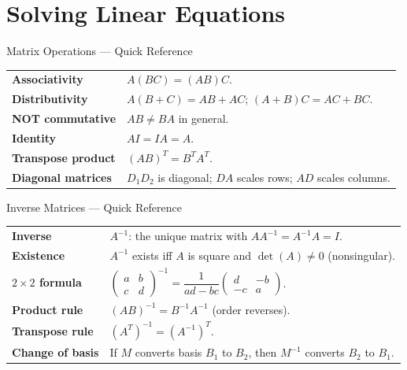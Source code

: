 

\section{Solving Linear Equations}

\begin{toolkitbox}{Matrix Operations --- Quick Reference}
\begin{tabular}{@{}p{}p{}@{}}
\textbf{Associativity}    & $A(BC) = (AB)C$. \\[4pt]
\textbf{Distributivity}   & $A(B+C) = AB + AC$; $(A+B)C = AC + BC$. \\[4pt]
\textbf{NOT commutative}  & $AB \neq BA$ in general. \\[4pt]
\textbf{Identity}         & $AI = IA = A$. \\[4pt]
\textbf{Transpose product}& $(AB)^T = B^T A^T$. \\[4pt]
\textbf{Diagonal matrices}& $D_1 D_2$ is diagonal; $DA$ scales rows; $AD$ scales columns. \\
\end{tabular}
\end{toolkitbox}


\begin{toolkitbox}{Inverse Matrices --- Quick Reference}
\begin{tabular}{@{}p{}p{}@{}}
\textbf{Inverse}          & $A^{-1}$: the unique matrix with $AA^{-1} = A^{-1}A = I$. \\[4pt]
\textbf{Existence}        & $A^{-1}$ exists iff $A$ is square and $\det(A) \neq 0$ (nonsingular). \\[4pt]
\textbf{$2\times 2$ formula} & $\begin{pmatrix} a & b \\ c & d \end{pmatrix}^{-1} = \dfrac{1}{ad-bc}\begin{pmatrix} d & -b \\ -c & a \end{pmatrix}$. \\[8pt]
\textbf{Product rule}     & $(AB)^{-1} = B^{-1}A^{-1}$ (order reverses). \\[4pt]
\textbf{Transpose rule}   & $(A^T)^{-1} = (A^{-1})^T$. \\[4pt]
\textbf{Change of basis}  & If $M$ converts basis $B_1$ to $B_2$, then $M^{-1}$ converts $B_2$ to $B_1$. \\
\end{tabular}
\end{toolkitbox}


